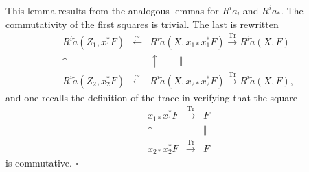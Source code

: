 \documentclass[10pt]{article}
\newcommand{\Tr}{\operatorname{Tr}}
\newcommand{\QED}{\hfill$\square$}
\begin{document}
This lemma results from the analogous lemmas for $R^ia_!$ and $R^ia_*$. The commutativity of the first squares is trivial. The last is rewritten
\[
\begin{array}{ccc}
R^i\widetilde a(Z_1,x_1^*F)&\xleftarrow{\sim}&R^i\widetilde a(X,x_{1*}x_1^*F)\xrightarrow{\Tr}R^i\widetilde a(X,F)\\
\uparrow&&\uparrow\qquad\Vert\\
R^i\widetilde a(Z_2,x_2^*F)&\xleftarrow{\sim}&R^i\widetilde a(X,x_{2*}x_2^*F)\xrightarrow{\Tr}R^i\widetilde a(X,F),
\end{array}
\]
and one recalls the definition of the trace in verifying that the square
\[
\begin{array}{ccc}
x_{1*}x_1^*F&\xrightarrow{\Tr}&F\\
\uparrow&&\Vert\\
x_{2*}x_2^*F&\xrightarrow{\Tr}&F
\end{array}
\]
is commutative. \QED
\end{document}
